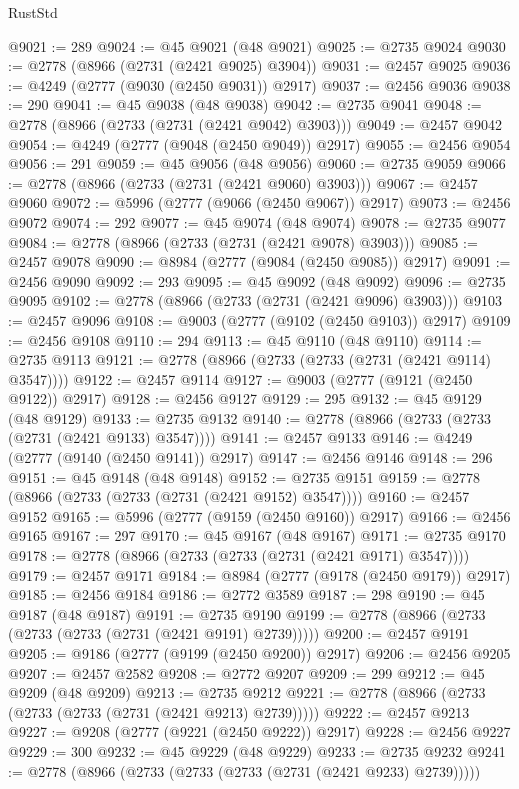 \begin{lexlean}{RustStd}
\begin{coremodule}
@9021 := 289
@9024 := @45 @9021 (@48 @9021)
@9025 := @2735 @9024
@9030 := @2778 (@8966 (@2731 (@2421 @9025) @3904))
@9031 := @2457 @9025
@9036 := @4249 (@2777 (@9030 (@2450 @9031)) @2917)
@9037 := @2456 @9036
@9038 := 290
@9041 := @45 @9038 (@48 @9038)
@9042 := @2735 @9041
@9048 := @2778 (@8966 (@2733 (@2731 (@2421 @9042) @3903)))
@9049 := @2457 @9042
@9054 := @4249 (@2777 (@9048 (@2450 @9049)) @2917)
@9055 := @2456 @9054
@9056 := 291
@9059 := @45 @9056 (@48 @9056)
@9060 := @2735 @9059
@9066 := @2778 (@8966 (@2733 (@2731 (@2421 @9060) @3903)))
@9067 := @2457 @9060
@9072 := @5996 (@2777 (@9066 (@2450 @9067)) @2917)
@9073 := @2456 @9072
@9074 := 292
@9077 := @45 @9074 (@48 @9074)
@9078 := @2735 @9077
@9084 := @2778 (@8966 (@2733 (@2731 (@2421 @9078) @3903)))
@9085 := @2457 @9078
@9090 := @8984 (@2777 (@9084 (@2450 @9085)) @2917)
@9091 := @2456 @9090
@9092 := 293
@9095 := @45 @9092 (@48 @9092)
@9096 := @2735 @9095
@9102 := @2778 (@8966 (@2733 (@2731 (@2421 @9096) @3903)))
@9103 := @2457 @9096
@9108 := @9003 (@2777 (@9102 (@2450 @9103)) @2917)
@9109 := @2456 @9108
@9110 := 294
@9113 := @45 @9110 (@48 @9110)
@9114 := @2735 @9113
@9121 := @2778 (@8966 (@2733 (@2733 (@2731 (@2421 @9114) @3547))))
@9122 := @2457 @9114
@9127 := @9003 (@2777 (@9121 (@2450 @9122)) @2917)
@9128 := @2456 @9127
@9129 := 295
@9132 := @45 @9129 (@48 @9129)
@9133 := @2735 @9132
@9140 := @2778 (@8966 (@2733 (@2733 (@2731 (@2421 @9133) @3547))))
@9141 := @2457 @9133
@9146 := @4249 (@2777 (@9140 (@2450 @9141)) @2917)
@9147 := @2456 @9146
@9148 := 296
@9151 := @45 @9148 (@48 @9148)
@9152 := @2735 @9151
@9159 := @2778 (@8966 (@2733 (@2733 (@2731 (@2421 @9152) @3547))))
@9160 := @2457 @9152
@9165 := @5996 (@2777 (@9159 (@2450 @9160)) @2917)
@9166 := @2456 @9165
@9167 := 297
@9170 := @45 @9167 (@48 @9167)
@9171 := @2735 @9170
@9178 := @2778 (@8966 (@2733 (@2733 (@2731 (@2421 @9171) @3547))))
@9179 := @2457 @9171
@9184 := @8984 (@2777 (@9178 (@2450 @9179)) @2917)
@9185 := @2456 @9184
@9186 := @2772 @3589
@9187 := 298
@9190 := @45 @9187 (@48 @9187)
@9191 := @2735 @9190
@9199 := @2778 (@8966 (@2733 (@2733 (@2733 (@2731 (@2421 @9191) @2739)))))
@9200 := @2457 @9191
@9205 := @9186 (@2777 (@9199 (@2450 @9200)) @2917)
@9206 := @2456 @9205
@9207 := @2457 @2582
@9208 := @2772 @9207
@9209 := 299
@9212 := @45 @9209 (@48 @9209)
@9213 := @2735 @9212
@9221 := @2778 (@8966 (@2733 (@2733 (@2733 (@2731 (@2421 @9213) @2739)))))
@9222 := @2457 @9213
@9227 := @9208 (@2777 (@9221 (@2450 @9222)) @2917)
@9228 := @2456 @9227
@9229 := 300
@9232 := @45 @9229 (@48 @9229)
@9233 := @2735 @9232
@9241 := @2778 (@8966 (@2733 (@2733 (@2733 (@2731 (@2421 @9233) @2739)))))

\end{coremodule}
\end{lexlean}

